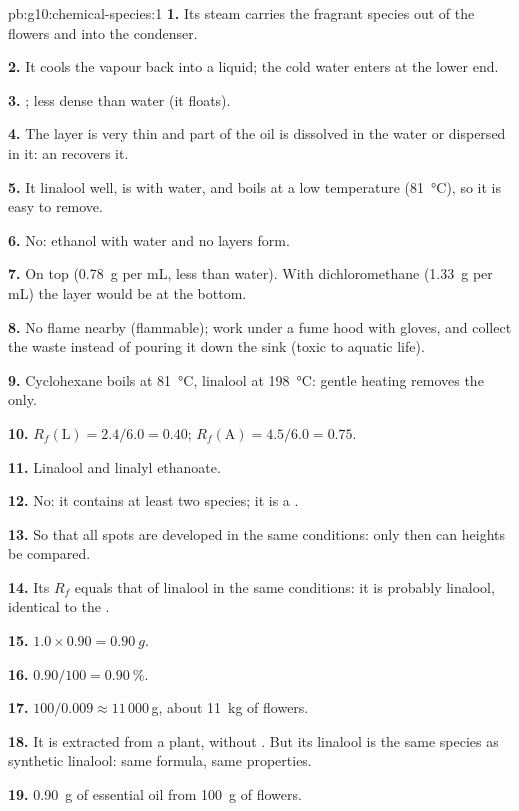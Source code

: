 \begin{solution}{pb:g10:chemical-species:1}
\textbf{1.} Its steam carries the fragrant species out of the flowers and
into the condenser.

\textbf{2.} It cools the vapour back into a liquid; the cold water enters
at the lower end.

\textbf{3.} ; less dense than water (it floats).

\textbf{4.} The layer is very thin and part of the oil is dissolved in the
water or dispersed in it: an  recovers it.

\textbf{5.} It  linalool well, is  with water, and
boils at a low temperature (\qty{81}{\celsius}), so it is easy to remove.

\textbf{6.} No: ethanol  with water and no layers form.

\textbf{7.} On top (\qty{0.78}{g} per mL, less than water). With
dichloromethane (\qty{1.33}{g} per mL) the  layer would be at the
bottom.

\textbf{8.} No flame nearby (flammable); work under a fume hood with
gloves, and collect the waste instead of pouring it down the sink
(toxic to aquatic life).

\textbf{9.} Cyclohexane boils at \qty{81}{\celsius}, linalool at
\qty{198}{\celsius}: gentle heating removes the  only.

\textbf{10.} $R_f(\text{L}) = 2.4/6.0 = 0.40$; $R_f(\text{A}) = 4.5/6.0
= 0.75$.

\textbf{11.} Linalool and linalyl ethanoate.

\textbf{12.} No: it contains at least two species; it is a .

\textbf{13.} So that all spots are developed in the same conditions:
only then can heights be compared.

\textbf{14.} Its $R_f$ equals that of linalool in the same conditions: it
is probably linalool, identical to the .

\textbf{15.} $1.0 \times 0.90 = \qty{0.90}{g}$.

\textbf{16.} $0.90/100 = \qty{0.90}{\percent}$.

\textbf{17.} $100/0.009 \approx 11\,000$\,g, about \qty{11}{kg} of
flowers.

\textbf{18.} It is extracted from a plant, without . But its
linalool is the same species as synthetic linalool: same formula, same
properties.

\textbf{19.} \qty{0.90}{g} of essential oil from \qty{100}{g} of flowers.
\end{solution}
